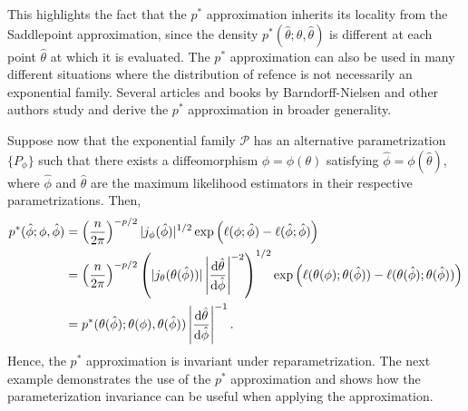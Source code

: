 This highlights the fact that the $p^*$ approximation inherits its locality from the Saddlepoint approximation, since the density $p^*(\hat\theta; \theta, \hat\theta)$ is different at each point $\hat\theta$ at which it is evaluated. The $p^*$ approximation can also be used in many different situations where the distribution of refence is not necessarily an exponential family. Several articles and books by Barndorff-Nielsen\cite{BarndorffNielsen1980,BarndorffNielsen1983} and other authors study and derive the $p^*$ approximation in broader generality.

Suppose now that the exponential family $\mathcal{P}$ has an alternative parametrization $\{ P_\phi \}$ such that there exists a diffeomorphism $\phi = \phi(\theta)$ satisfying $\hat\phi = \phi(\hat\theta)$, where $\hat\phi$ and $\hat\theta$ are the maximum likelihood estimators in their respective parametrizations. Then, 
\begin{align*}
    p^*(\hat\phi; \phi, \hat \phi) 
&= \left(\frac{n}{2\pi}\right)^{-p/2}|j_\phi(\hat\phi)|^{1/2} \exp\left(\ell(\phi; \hat \phi) - \ell(\hat\phi; \hat \phi)\right)\\
&= \left(\frac{n}{2\pi}\right)^{-p/2}\left(|j_\theta(\theta(\hat\phi))|\left|\frac{\text{d} \hat\theta}{\text{d} \hat\phi}\right|^{-2}\right)^{1/2} \exp\left(\ell(\theta(\phi); \theta(\hat \phi)) - \ell(\theta(\hat\phi); \theta(\hat \phi))\right)\\
&= p^*(\theta(\hat\phi); \theta(\phi), \theta(\hat \phi))\left|\frac{\text{d} \hat\theta}{\text{d} \hat\phi}\right|^{-1}.
\end{align*}
Hence, the $p^*$ approximation is invariant under reparametrization. The next example demonstrates the use of the $p^*$ approximation and shows how the parameterization invariance can be useful when applying the approximation.

